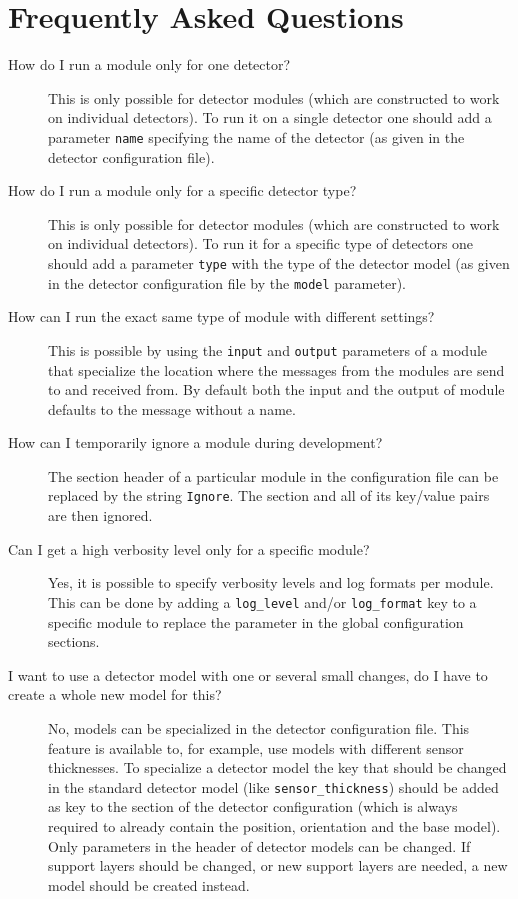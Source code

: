 \section{Frequently Asked Questions}
\label{sec:faq}
\begin{description}
\item[How do I run a module only for one detector?]
This is only possible for detector modules (which are constructed to work on individual detectors). To run it on a single detector one should add a parameter \texttt{name} specifying the name of the detector (as given in the detector configuration file).
\item[How do I run a module only for a specific detector type?]
This is only possible for detector modules (which are constructed to work on individual detectors). To run it for a specific type of detectors one should add a parameter \texttt{type} with the type of the detector model (as given in the detector configuration file by the \texttt{model} parameter).
\item[How can I run the exact same type of module with different settings?] This is possible by using the \texttt{input} and \texttt{output} parameters of a module that specialize the location where the messages from the modules are send to and received from. By default both the input and the output of module defaults to the message without a name.
\item[How can I temporarily ignore a module during development?]
The section header of a particular module in the configuration file can be replaced by the string \texttt{Ignore}. The section and all of its key/value pairs are then ignored.
\item[Can I get a high verbosity level only for a specific module?]
Yes, it is possible to specify verbosity levels and log formats per module. This can be done by adding a \texttt{log\_level} and/or \texttt{log\_format} key to a specific module to replace the parameter in the global configuration sections.
\item[I want to use a detector model with one or several small changes, do I have to create a whole new model for this?] No, models can be specialized in the detector configuration file. This feature is available to, for example, use models with different sensor thicknesses. To specialize a detector model the key that should be changed in the standard detector model (like \texttt{sensor\_thickness}) should be added as key to the section of the detector configuration (which is always required to already contain the position, orientation and the base model). Only parameters in the header of detector models can be changed. If support layers should be changed, or new support layers are needed, a new model should be created instead.

\end{description}
